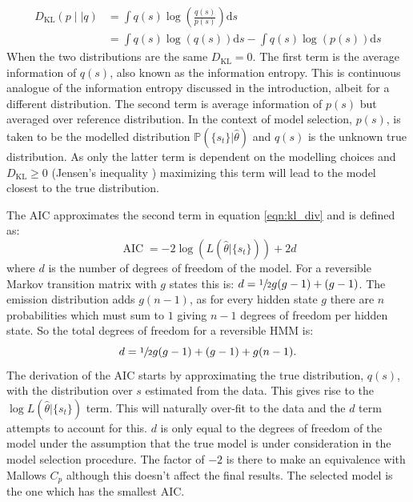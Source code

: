 \begin{equation}\label{eqn:kl_div}
\begin{split}
    D_{\mathrm{KL}}\left(p\mid | q\right) & = \int q(s) \log{\left(\frac{ q(s) }{p(s)}  \right)} \mathrm{d}s \\ 
    & = \int q(s) \log{\left(q(s)\right)}\mathrm{d}s - \int q(s)\log{\left(p(s)\right)} \mathrm{d}s
\end{split}
\end{equation}
When the two distributions are the same $D_{\mathrm{KL}} = 0$. The first term is the average information of $q(s)$, also known as the information entropy\cite{mackay2003information}. This is continuous analogue of the information entropy discussed in the introduction, albeit for a different distribution. The second term is average information of $p(s)$ but averaged over reference distribution\cite{mackay2003information}. In the context of model selection, $p(s)$, is taken to be the modelled distribution $\mathbb{P}(\{s_t\}|\hat{\theta})$ and $q(s)$ is the unknown true distribution. As only the latter term is dependent on the modelling choices and  $D_{\mathrm{KL}} \ge 0$ (Jensen's inequality \cite{mackay2003information}) maximizing this term will lead to the model closest to the true distribution.  

The AIC approximates the second term in equation \ref{eqn:kl_div} and is defined as\cite{akaikeInformationTheoryExtension1998}:
\begin{equation}\label{eqn:aic}
    \operatorname{AIC} = -2\log{\left(L\left(\hat{\theta}|\{s_t\}\right)\right)} + 2d
\end{equation}
where $d$ is the number of degrees of freedom of the model. For a reversible Markov transition matrix with $g$ states this is: $d = \sfrac{1}{2}g(g-1) + (g-1)$\cite{trendelkamp-schroerEstimationUncertaintyReversible2015b}. The emission distribution adds $g(n-1)$, as for every hidden state $g$ there are $n$ probabilities which must sum to $1$ giving $n-1$ degrees of freedom per hidden state. So the total degrees of freedom for a reversible HMM is:
\begin{equation}\label{eqn:hmm_dof}
    d = \sfrac{1}{2}g(g-1) + (g-1) + g(n-1). 
\end{equation}
The derivation of the AIC starts by approximating the true distribution, $q(s)$, with the distribution over $s$ estimated from the data. This gives rise to the $\log{L\left(\hat{\theta}|\{s_t\} \right)}$ term\cite{mclachlanFiniteMixtureModels2000}.  This will naturally over-fit to the data and the $d$ term attempts to account for this. $d$ is only equal to the degrees of freedom of the model under the assumption that the true model is under consideration in the model selection procedure\cite{ripley_1996}.  The factor of $-2$ is there to make an equivalence with Mallows $C_p$\cite{friedman2001elements} although this doesn't affect the final results. The selected model is the one which has the smallest AIC. 

